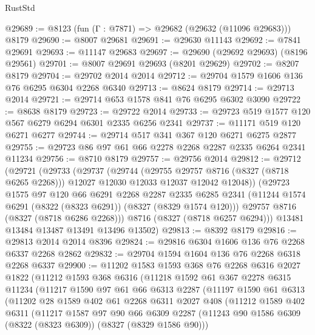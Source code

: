 \begin{lexlean}{RustStd}
\begin{coremodule}
{\begin{coremodule}
{{{{{{{{{{{{{{{{{{{{{{{{{{{{{{{{{{{{{{{{{{{{{{{{{{{{{{@29689 := @8123 (fun (Γ : @7871) => @29682 (@29632 (@11096 @29683))) @8179
@29690 := @8007 @29681
@29691 := @29630 @11143
@29692 := @7841 @29691
@29693 := @11147 @29683
@29697 := @29690 (@29692 @29693) (@8196 @29561)
@29701 := @8007 @29691 @29693 (@8201 @29629)
@29702 := @8207 @8179
@29704 := @29702 @2014 @2014
@29712 := @29704 @1579 @1606 @136 @76 @6295 @6304 @2268 @6340
@29713 := @8624 @8179
@29714 := @29713 @2014
@29721 := @29714 @653 @1578 @841 @76 @6295 @6302 @3090
@29722 := @8638 @8179
@29723 := @29722 @2014
@29733 := @29723 @519 @1577 @120 @567 @6279 @6294 @6301 @2335 @6256 @2341
@29737 := @11171 @519 @120 @6271 @6277
@29744 := @29714 @517 @341 @367 @120 @6271 @6275 @2877
@29755 := @29723 @86 @97 @61 @66 @2278 @2268 @2287 @2335 @6264 @2341 @11234
@29756 := @8710 @8179
@29757 := @29756 @2014
@29812 := @29712
    (@29721
      (@29733
        (@29737
          (@29744
            (@29755 @29757 @8716 (@8327 (@8718 @6265 @2268)))
            @12027
            @12030
            @12033
            @12037
            @12042
            @12048))
        (@29723
          @1575
          @97
          @120
          @66
          @6291
          @2268
          @2287
          @2335
          @6285
          @2341
          (@11244 @1574 @6291 (@8322 (@8323 @6291)) (@8327 (@8329 @1574 @120)))
          @29757
          @8716
          (@8327 (@8718 @6286 @2268)))
        @8716
        (@8327 (@8718 @6257 @6294)))
      @13481
      @13484
      @13487
      @13491
      @13496
      @13502)
@29813 := @8392 @8179
@29816 := @29813 @2014 @2014 @8396
@29824 := @29816 @6304 @1606 @136 @76 @2268 @6337 @2268 @2862
@29832 := @29704 @1594 @1604 @136 @76 @2268 @6318 @2268 @6337
@29900 := @11202
    @1583
    @1593
    @368
    @76
    @2268
    @6316
    @2027
    @1822
    (@11212
      @1593
      @368
      @6316
      (@11218
        @1592
        @61
        @367
        @2278
        @6315
        @11234
        (@11217
          @1590
          @97
          @61
          @66
          @6313
          @2287
          (@11197
            @1590
            @61
            @6313
            (@11202
              @28
              @1589
              @402
              @61
              @2268
              @6311
              @2027
              @408
              (@11212
                @1589
                @402
                @6311
                (@11217
                  @1587
                  @97
                  @90
                  @66
                  @6309
                  @2287
                  (@11243 @90 @1586 @6309 (@8322 (@8323 @6309)) (@8327 (@8329 @1586 @90)))
}}}}}}}}}}}}}}}}}}}}}}}}}}}}}}}}}}}}}}}}}}}}}}}}}}}}}}
\end{coremodule}}
\end{coremodule}
\end{lexlean}
